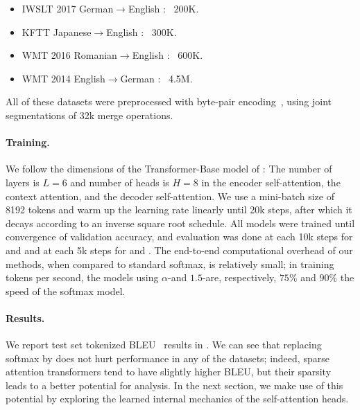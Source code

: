 \begin{itemize}[itemsep=.5ex,leftmargin=2ex]
    \item IWSLT 2017 German$\rightarrow$English
          \citep[,][]{cettolooverview}: ~200K.
    \item KFTT Japanese$\rightarrow$English
          \citep[,][]{neubig11kftt}: ~300K.
    \item WMT 2016 Romanian$\rightarrow$English
          \citep[,][]{bojar2016findings}: ~600K.
    \item WMT 2014 English$\rightarrow$German
          \citep[,][]{bojar2014findings}: ~4.5M.
\end{itemize}

All of these datasets were preprocessed with byte-pair
encoding~\citep[BPE;][]{sennrich2016neural}, using joint
segmentations of 32k merge operations.

\paragraph*{Training.}
We follow the dimensions of the Transformer-Base model of
\citet{vaswani2017attention}: The number of layers is $L=6$ and
number of heads is $H=8$ in the encoder self-attention, the context
attention, and the decoder self-attention. We use a mini-batch size
of 8192 tokens and warm up the learning rate linearly until 20k
steps, after which it decays according to an inverse square root
schedule. All models were trained until convergence of validation
accuracy, and evaluation was done at each 10k steps for
 and  and at each 5k steps for
 and . The end-to-end computational
overhead of our methods, when compared to standard softmax, is
relatively small; in training tokens per second, the models using
$\alpha$-\entmaxtext and $1.5$-\entmaxtext are, respectively, $75\%$
and $90\%$ the speed of the softmax model.

\paragraph*{Results.}
We report test set tokenized BLEU~\citep{papineni2002bleu} results in
. We can see that replacing softmax by
\entmaxtext{} does not hurt performance in any of the datasets;
indeed, sparse attention transformers tend to have slightly higher
BLEU, but their sparsity leads to a better potential for analysis. In
the next section, we make use of this potential by exploring the
learned internal mechanics of the self-attention heads.

